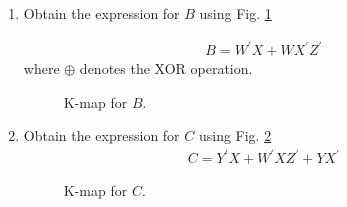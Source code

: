 \renewcommand{\theequation}{\theenumi}
\renewcommand{\thefigure}{\theenumi}
\begin{enumerate}[label=\thesubsection.\arabic*.,ref=\thesubsection.\theenumi]


\item Obtain the expression for $B$ using Fig. \ref{fig:inc_kmapX_B}


\solution

\begin{align}
\label{eq:kmapX_inc_B}
B=W^{\prime}X+WX^{\prime}Z^{\prime}
\end{align}
%
where $\oplus$ denotes the XOR operation.
\begin{figure}[!ht]
\centering
\resizebox{\columnwidth}{!} {

}
\caption{K-map for $B$.}
\label{fig:inc_kmapX_B}
\end{figure}
%
\item Obtain the expression for $C$ using Fig. \ref{fig:inc_kmapX_C}
\begin{align}
\label{eq:kmapX_inc_C}
C = Y^{\prime}X+W^{\prime}XZ^{\prime}+YX^{\prime}
\end{align}
%
\begin{figure}[!ht]
\centering
\resizebox{\columnwidth}{!} {

}
\caption{K-map for $C$.}
\label{fig:inc_kmapX_C}
\end{figure}
\end{enumerate}
